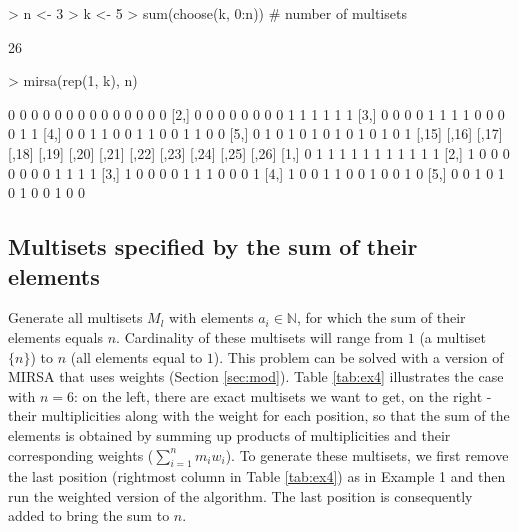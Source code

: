 \documentclass[12pt]{article}
\begin{document}
\begin{Schunk}
\begin{Sinput}
> n <- 3
> k <- 5
> sum(choose(k, 0:n))  # number of multisets
\end{Sinput}
\begin{Soutput}
[1] 26
\end{Soutput}
\begin{Sinput}
> mirsa(rep(1, k), n)
\end{Sinput}
\begin{Soutput}
     [,1] [,2] [,3] [,4] [,5] [,6] [,7] [,8] [,9] [,10] [,11] [,12] [,13] [,14]
[1,]    0    0    0    0    0    0    0    0    0     0     0     0     0     0
[2,]    0    0    0    0    0    0    0    0    1     1     1     1     1     1
[3,]    0    0    0    0    1    1    1    1    0     0     0     0     1     1
[4,]    0    0    1    1    0    0    1    1    0     0     1     1     0     0
[5,]    0    1    0    1    0    1    0    1    0     1     0     1     0     1
     [,15] [,16] [,17] [,18] [,19] [,20] [,21] [,22] [,23] [,24] [,25] [,26]
[1,]     0     1     1     1     1     1     1     1     1     1     1     1
[2,]     1     0     0     0     0     0     0     0     1     1     1     1
[3,]     1     0     0     0     0     1     1     1     0     0     0     1
[4,]     1     0     0     1     1     0     0     1     0     0     1     0
[5,]     0     0     1     0     1     0     1     0     0     1     0     0
\end{Soutput}
\end{Schunk}

\subsection{Multisets specified by the sum of their elements}

Generate all multisets $M_l$ with elements $a_i \in \mathbb{N}$, for which the sum of their elements equals $n$. Cardinality of these multisets will range from $1$ (a multiset $\{n\}$) to $n$ (all elements equal to $1$). This problem can be solved with a version of MIRSA that uses weights (Section \ref{sec:mod}). Table \ref{tab:ex4} illustrates the case with $n = 6$: on the left, there are exact multisets we want to get, on the right - their multiplicities along with the weight for each position, so that the sum of the elements is obtained by summing up products of multiplicities and their corresponding weights ($\sum_{i = 1}^n m_i w_i$). To generate these multisets, we first remove the last position (rightmost column in Table \ref{tab:ex4}) as in Example 1 and then run the weighted version of the algorithm. The last position is consequently added to bring the sum to $n$. 
\end{document}
